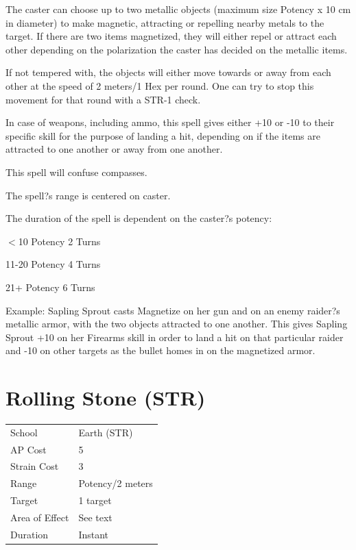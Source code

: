 \documentclass[11pt,a4paper,twocolumn]{book}
\begin{document}
	\medskip
	
	The caster can choose up to two metallic objects (maximum size Potency x 10 cm in diameter) to make magnetic, attracting or repelling nearby metals to the target. If there are two items magnetized, they will either repel or attract each other depending on the polarization the caster has decided on the metallic items. 
	
	If not tempered with, the objects will either move towards or away from each other at the speed of 2 meters/1 Hex per round. One can try to stop this movement for that round with a STR-1 check.
	
	In case of weapons, including ammo, this spell gives either +10 or -10 to their specific skill for the purpose of landing a hit, depending on if the items are attracted to one another or away from one another.
	
	This spell will confuse compasses.
	
	The spell?s range is centered on caster.
	
	The duration of the spell is dependent on the caster?s potency:
	
	\begin{compactitem}
		\item $<$10 Potency 		2 Turns
		\item 11-20 Potency 		4 Turns
		\item 21+ Potency 			6 Turns
	\end{compactitem}

	Example: Sapling Sprout casts Magnetize on her gun and on an enemy raider?s metallic armor, with the two objects attracted to one another. This gives Sapling Sprout +10 on her Firearms skill in order to land a hit on that particular raider and -10 on other targets as the bullet homes in on the magnetized armor.
	
		\section*{Rolling Stone (STR)}
	{
		\begin{tabu} to 75mm{| X[l,4] | X[l,7] |}
			\hline
			School 			&  Earth (STR)			\\
			AP Cost	      	&  5					\\
			Strain Cost     &  3					\\
			Range     		&  Potency/2 meters		\\
			Target      	&  1 target				\\
			Area of Effect  &  See text	 			\\
			Duration     	&  Instant				\\ \hline
		\end{tabu}
		
	}
	
\end{document}

